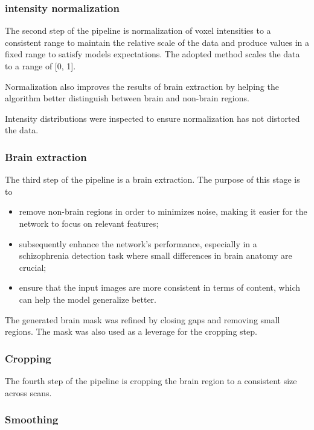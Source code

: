\subsubsection{intensity normalization}

The second step of the pipeline is normalization of voxel intensities to a consistent range to maintain the relative scale of the data and produce values in a fixed range to satisfy models expectations. The adopted method scales the data to a range of [0, 1].

Normalization also improves the results of brain extraction by helping the algorithm better distinguish between brain and non-brain regions.

Intensity distributions were inspected to ensure normalization has not distorted the data.

\subsubsection{Brain extraction}

The third step of the pipeline is a brain extraction. The purpose of this stage is to
\begin{itemize}
    \item remove non-brain regions in order to minimizes noise, making it easier for the network to focus on relevant features;
    \item subsequently enhance the network's performance, especially in a schizophrenia detection task where small differences in brain anatomy are crucial;
    \item ensure that the input images are more consistent in terms of content, which can help the model generalize better.
\end{itemize}

The generated brain mask was refined by closing gaps and removing small regions. The mask was also used as a leverage for the cropping step.

\subsubsection{Cropping}

The fourth step of the pipeline is cropping the brain region to a consistent size across scans.

\subsubsection{Smoothing}

